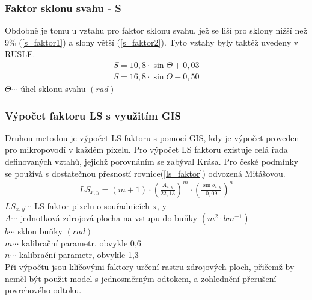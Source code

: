 \subsubsection{Faktor sklonu svahu - S} 
Obdobně je tomu u vztahu pro faktor sklonu svahu, jež se liší pro
sklony nižší než 9\% (\ref{s_faktor1}) a slony větší
(\ref{s_faktor2}). Tyto vztahy byly taktéž uvedeny v
RUSLE\cite{rusle1997}.
\begin{align}
   \label{s_faktor1} S=10,8\cdot\sin\Theta + 0,03
\end{align}
\vspace{-40pt}
\begin{align}
   \label{s_faktor2} S=16,8\cdot\sin\Theta - 0,50
\end{align}
\hspace*{2cm}$\Theta \cdots$ úhel sklonu svahu $\left( rad \right)$

\subsubsection{Výpočet faktoru LS s využitím GIS} 
Druhou metodou je výpočet LS faktoru s pomocí GIS, kdy je výpočet
proveden pro mikropovodí v každém pixelu. Pro výpočet LS faktoru
existuje celá řada definovaných vztahů, jejichž porovnáním se zabýval
Krása\cite{Krasa2010}. Pro české podmínky se používá s dostatečnou
přesností rovnice(\ref{ls_faktor}) odvozená
Mitášovou\cite{Mitasova1998}.\cite{Dostal2014}
\begin{align}
   \label{ls_faktor} LS_{x,y}=\left( m+1 \right)\cdot\left(\frac{A_{x,y}}{22,13}\right)^m \cdot \left(\frac{\sin b_{x,y}}{0,09}\right)^n
\end{align}
\hspace*{2cm}$LS_{x,y} \cdots$ LS faktor pixelu o souřadnicích x, y
\\ \hspace*{2cm}$A \cdots$ jednotková zdrojová plocha na vstupu do
buňky $\left( m^2\cdot bm^{-1} \right)$ \\
\hspace*{2cm}$b \cdots$ sklon buňky $\left( rad \right)$ \\
\hspace*{2cm}$m \cdots$ kalibrační parametr, obvykle 0,6\\
\hspace*{2cm}$n \cdots$ kalibrační parametr, obvykle 1,3\\

Při výpočtu jsou klíčovými faktory určení rastru zdrojových ploch,
přičemž by neměl být použit model s jednosměrným odtokem, a zohlednění
přerušení povrchového odtoku.\cite{Krasa2010}

